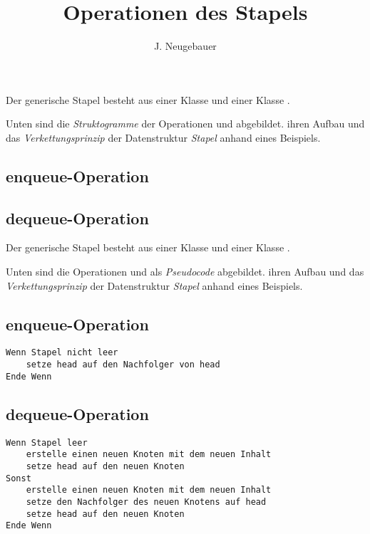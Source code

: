 \documentclass[10pt, a4paper]{scrartcl}
\author{J. Neugebauer}
\title{Operationen des Stapels}
\date{\Heute}
\begin{document}
\ReiheTitel

Der generische Stapel besteht aus einer Klasse  und einer Klasse .


\begin{aufgabe}
	Unten sind die \emph{Struktogramme} der Operationen  und  abgebildet.  ihren Aufbau und   das \emph{Verkettungsprinzip} der Datenstruktur \emph{Stapel} anhand eines Beispiels.

\subsection*{enqueue-Operation}

\subsection*{dequeue-Operation}
\end{aufgabe}

\clearpage

\ReiheTitel

Der generische Stapel besteht aus einer Klasse  und einer Klasse .


\begin{aufgabe}
	Unten sind die Operationen  und  als \emph{Pseudocode} abgebildet.  ihren Aufbau und   das \emph{Verkettungsprinzip} der Datenstruktur \emph{Stapel} anhand eines Beispiels.

\subsection*{enqueue-Operation}
\begin{lstlisting}
Wenn Stapel nicht leer
	setze head auf den Nachfolger von head
Ende Wenn
\end{lstlisting}

\subsection*{dequeue-Operation}
\begin{lstlisting}
Wenn Stapel leer 
	erstelle einen neuen Knoten mit dem neuen Inhalt
	setze head auf den neuen Knoten
Sonst
	erstelle einen neuen Knoten mit dem neuen Inhalt
	setze den Nachfolger des neuen Knotens auf head
	setze head auf den neuen Knoten
Ende Wenn
\end{lstlisting}
\end{aufgabe}
\end{document}

